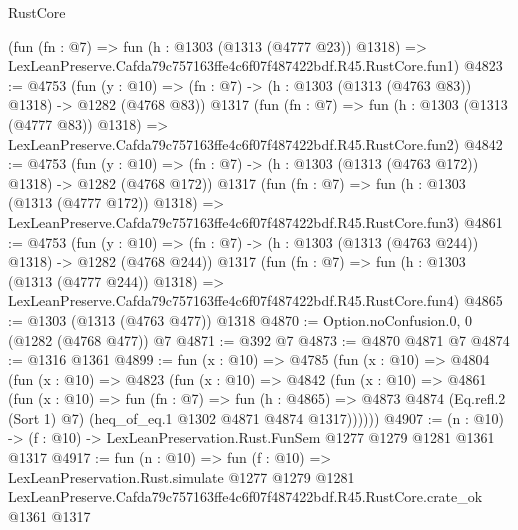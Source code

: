 \begin{lexlean}{RustCore}
\begin{coremodule}
    (fun (fn : @7) =>
    fun (h : @1303 (@1313 (@4777 @23)) @1318) =>
    LexLeanPreserve.Cafda79c757163ffe4c6f07f487422bdf.R45.RustCore.fun1)
@4823 := @4753
    (fun (y : @10) => (fn : @7) -> (h : @1303 (@1313 (@4763 @83)) @1318) -> @1282 (@4768 @83))
    @1317
    (fun (fn : @7) =>
    fun (h : @1303 (@1313 (@4777 @83)) @1318) =>
    LexLeanPreserve.Cafda79c757163ffe4c6f07f487422bdf.R45.RustCore.fun2)
@4842 := @4753
    (fun (y : @10) => (fn : @7) -> (h : @1303 (@1313 (@4763 @172)) @1318) -> @1282 (@4768 @172))
    @1317
    (fun (fn : @7) =>
    fun (h : @1303 (@1313 (@4777 @172)) @1318) =>
    LexLeanPreserve.Cafda79c757163ffe4c6f07f487422bdf.R45.RustCore.fun3)
@4861 := @4753
    (fun (y : @10) => (fn : @7) -> (h : @1303 (@1313 (@4763 @244)) @1318) -> @1282 (@4768 @244))
    @1317
    (fun (fn : @7) =>
    fun (h : @1303 (@1313 (@4777 @244)) @1318) =>
    LexLeanPreserve.Cafda79c757163ffe4c6f07f487422bdf.R45.RustCore.fun4)
@4865 := @1303 (@1313 (@4763 @477)) @1318
@4870 := Option.noConfusion.{0, 0} (@1282 (@4768 @477)) @7
@4871 := @392 @7
@4873 := @4870 @4871 @7
@4874 := @1316 @1361
@4899 := fun (x : @10) =>
  @4785
    (fun (x : @10) =>
    @4804
      (fun (x : @10) =>
      @4823
        (fun (x : @10) =>
        @4842
          (fun (x : @10) =>
          @4861
            (fun (x : @10) =>
            fun (fn : @7) =>
            fun (h : @4865) =>
            @4873 @4874 (Eq.refl.{2} (Sort 1) @7) (heq_of_eq.{1} @1302 @4871 @4874 @1317))))))
@4907 := (n : @10) -> (f : @10) -> LexLeanPreservation.Rust.FunSem @1277 @1279 @1281 @1361 @1317
@4917 := fun (n : @10) =>
  fun (f : @10) =>
  LexLeanPreservation.Rust.simulate
    @1277
    @1279
    @1281
    LexLeanPreserve.Cafda79c757163ffe4c6f07f487422bdf.R45.RustCore.crate_ok
    @1361
    @1317
\end{coremodule}
\end{lexlean}

